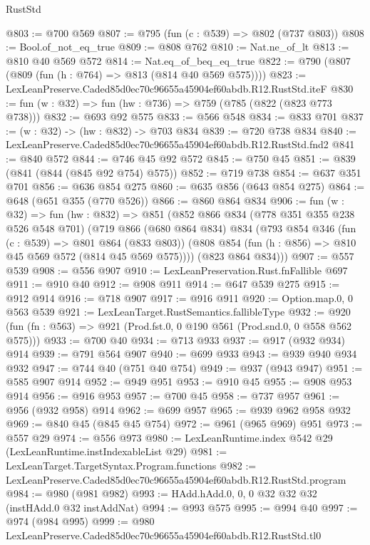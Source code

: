 \begin{lexlean}{RustStd}
\begin{coremodule}
@803 := @700 @569
@807 := @795 (fun (c : @539) => @802 (@737 @803))
@808 := Bool.of_not_eq_true
@809 := @808 @762
@810 := Nat.ne_of_lt
@813 := @810 @40 @569 @572
@814 := Nat.eq_of_beq_eq_true
@822 := @790 (@807 (@809 (fun (h : @764) => @813 (@814 @40 @569 @575))))
@823 := LexLeanPreserve.Caded85d0ec70c96655a45904ef60abdb.R12.RustStd.iteF
@830 := fun (w : @32) => fun (hw : @736) => @759 (@785 (@822 (@823 @773 @738)))
@832 := @693 @92 @575
@833 := @566 @548
@834 := @833 @701
@837 := (w : @32) -> (hw : @832) -> @703 @834
@839 := @720 @738 @834
@840 := LexLeanPreserve.Caded85d0ec70c96655a45904ef60abdb.R12.RustStd.fnd2
@841 := @840 @572
@844 := @746 @45 @92 @572
@845 := @750 @45
@851 := @839 (@841 (@844 (@845 @92 @754) @575))
@852 := @719 @738
@854 := @637 @351 @701
@856 := @636 @854 @275
@860 := @635 @856 (@643 @854 @275)
@864 := @648 (@651 @355 (@770 @526))
@866 := @860 @864 @834
@906 := fun (w : @32) =>
  fun (hw : @832) =>
  @851
    (@852
      @866
      @834
      (@778 @351 @355 @238 @526 @548 @701)
      (@719
        @866
        (@680 @864 @834)
        @834
        (@793
          @854
          @346
          (fun (c : @539) => @801 @864 (@833 @803))
          (@808 @854 (fun (h : @856) => @810 @45 @569 @572 (@814 @45 @569 @575))))
        (@823 @864 @834)))
@907 := @557 @539
@908 := @556 @907
@910 := LexLeanPreservation.Rust.fnFallible @697
@911 := @910 @40
@912 := @908 @911
@914 := @647 @539 @275
@915 := @912 @914
@916 := @718 @907
@917 := @916 @911
@920 := Option.map.{0, 0} @563 @539
@921 := LexLeanTarget.RustSemantics.fallibleType
@932 := @920 (fun (fn : @563) => @921 (Prod.fst.{0, 0} @190 @561 (Prod.snd.{0, 0} @558 @562 @575)))
@933 := @700 @40
@934 := @713 @933
@937 := @917 (@932 @934) @914
@939 := @791 @564 @907
@940 := @699 @933
@943 := @939 @940 @934 @932
@947 := @744 @40 (@751 @40 @754)
@949 := @937 (@943 @947)
@951 := @585 @907 @914
@952 := @949 @951
@953 := @910 @45
@955 := @908 @953 @914
@956 := @916 @953
@957 := @700 @45
@958 := @737 @957
@961 := @956 (@932 @958) @914
@962 := @699 @957
@965 := @939 @962 @958 @932
@969 := @840 @45 (@845 @45 @754)
@972 := @961 (@965 @969) @951
@973 := @557 @29
@974 := @556 @973
@980 := LexLeanRuntime.index @542 @29 (LexLeanRuntime.instIndexableList @29)
@981 := LexLeanTarget.TargetSyntax.Program.functions
@982 := LexLeanPreserve.Caded85d0ec70c96655a45904ef60abdb.R12.RustStd.program
@984 := @980 (@981 @982)
@993 := HAdd.hAdd.{0, 0, 0} @32 @32 @32 (instHAdd.{0} @32 instAddNat)
@994 := @993 @575
@995 := @994 @40
@997 := @974 (@984 @995)
@999 := @980 LexLeanPreserve.Caded85d0ec70c96655a45904ef60abdb.R12.RustStd.tl0

\end{coremodule}
\end{lexlean}
